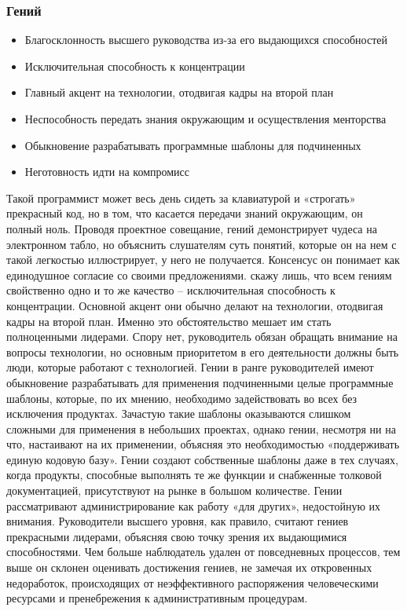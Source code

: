 \documentclass{../industrial-development}
\begin{document}
\begin{frame} \frametitle{Гений}
\begin{itemize}
		\item Благосклонность высшего руководства из-за его выдающихся способностей
		\item Исключительная способность к концентрации
		\item Главный акцент на технологии, отодвигая кадры на второй план
		\item Неспособность передать знания окружающим и осуществления менторства
		\item Обыкновение разрабатывать программные шаблоны для  подчиненных 
		\item Неготовность идти на компромисс				
	\end{itemize}
\end{frame}
\lecturenotes
Такой программист может весь день сидеть за клавиатурой и «строгать» прекрасный код, но в том, что касается передачи знаний окружающим, он полный ноль. Проводя проектное совещание, гений демонстрирует чудеса на электронном табло, но объяснить слушателям суть понятий, которые он на нем с такой легкостью иллюстрирует, у него не получается. Консенсус он понимает как единодушное согласие со своими предложениями. скажу лишь, что всем гениям свойственно одно и то же качество – исключительная способность к концентрации. 
Основной акцент они обычно делают на технологии, отодвигая кадры на второй план. Именно это обстоятельство мешает им стать полноценными лидерами. Спору нет, руководитель обязан обращать внимание на вопросы технологии, но основным приоритетом в его деятельности должны быть люди, которые работают с технологией. Гении в ранге руководителей имеют обыкновение разрабатывать для применения подчиненными целые программные шаблоны, которые, по их мнению, необходимо задействовать во всех без исключения продуктах. Зачастую такие шаблоны оказываются слишком сложными для применения в небольших проектах, однако гении, несмотря ни на что, настаивают на их применении, объясняя это необходимостью «поддерживать единую кодовую базу». Гении создают собственные шаблоны даже в тех случаях, когда продукты, способные выполнять те же функции и снабженные толковой документацией, присутствуют на рынке в большом количестве. 
Гении рассматривают администрирование как работу «для других», недостойную их внимания. Руководители высшего уровня, как правило, считают гениев прекрасными лидерами, объясняя свою точку зрения их выдающимися способностями. Чем больше наблюдатель удален от повседневных процессов, тем выше он склонен оценивать достижения гениев, не замечая их откровенных недоработок, происходящих от неэффективного распоряжения человеческими ресурсами и пренебрежения к административным процедурам. 
\end{document}
